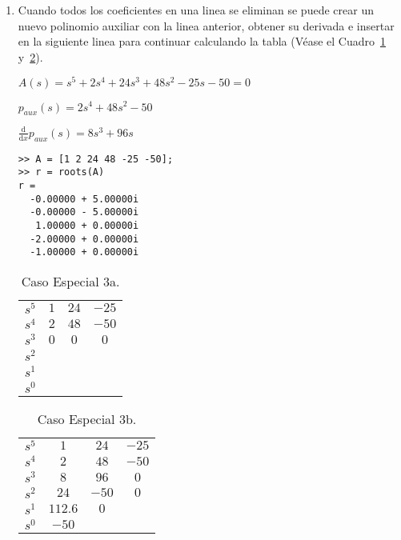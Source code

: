 \begin{enumerate}
\item
Cuando todos los coeficientes en una linea se eliminan se puede crear un nuevo polinomio auxiliar con la linea anterior, obtener su derivada e insertar en la siguiente linea para continuar calculando la tabla (Véase el Cuadro~\ref{tab:Caso3a} y~\ref{tab:Caso3b}).

\begin{math}
A(s) = s^5 + 2 s^4 + 24 s^3 + 48 s^2 - 25 s - 50 = 0
\end{math}

\begin{math}
p_{aux}(s) = 2 s^4 + 48 s^2 - 50
\end{math}

\begin{math}
\frac{\mathrm d}{\mathrm d x} p_{aux}(s) = 8 s^3 + 96 s
\end{math}

\begin{verbatim}
>> A = [1 2 24 48 -25 -50];
>> r = roots(A)
r =
  -0.00000 + 5.00000i
  -0.00000 - 5.00000i
   1.00000 + 0.00000i
  -2.00000 + 0.00000i
  -1.00000 + 0.00000i
\end{verbatim}

\begin{table}[htbp]
\centering
\begin{tabular}{c|c c c}
$s^5$ & $1$ & $24$ & $-25$ \\
$s^4$ & $2$ & $48$ & $-50$ \\
$s^3$ & $0$ & $0$  & $0$   \\
$s^2$ \\
$s^1$ \\
$s^0$
\end{tabular}
\caption{\label{tab:Caso3a}Caso Especial 3a.}
\end{table}

\begin{table}[htbp]
\centering
\begin{tabular}{c|c c c}
$s^5$ & $1$ & $24$ & $-25$ \\
$s^4$ & $2$ & $48$ & $-50$ \\
$s^3$ & $8$ & $96$ & $0$   \\
$s^2$ & $24$ & $-50$ & $0$ \\
$s^1$ & $112.6$ & $0$ \\
$s^0$ & $-50$
\end{tabular}
\caption{\label{tab:Caso3b}Caso Especial 3b.}
\end{table}

\end{enumerate}
